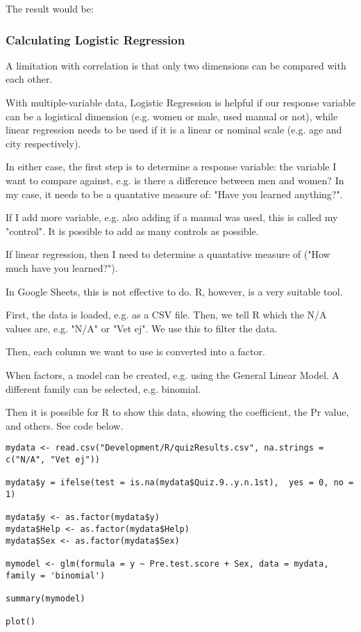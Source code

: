 The result would be:


\subsubsection{Calculating Logistic Regression}

A limitation with correlation is that only two dimensions can be compared with each other.

With multiple-variable data, Logistic Regression is helpful if our response variable can be a logistical dimension (e.g. women or male, used manual or not), while linear regression needs to be used if it is a linear or nominal scale (e.g. age and city respectively).

In either case, the first step is to determine a response variable: the variable I want to compare against, e.g. is there a difference between men and women? In my case, it needs to be a quantative measure of: "Have you learned anything?".

If I add more variable, e.g. also adding if a manual was used, this is called my "control". It is possible to add as many controls as possible.

If linear regression, then I need to determine a quantative measure of ("How much have you learned?").

In Google Sheets, this is not effective to do. R, however, is a very suitable tool.

First, the data is loaded, e.g. as a CSV file. Then, we tell R which the N/A values are, e.g. "N/A" or "Vet ej". We use this to filter the data.

Then, each column we want to use is converted into a factor.

When factors, a model can be created, e.g. using the General Linear Model. A different family can be selected, e.g. binomial.

Then it is possible for R to show this data, showing the coefficient, the Pr value, and others. See code below.

\begin{verbatim}
mydata <- read.csv("Development/R/quizResults.csv", na.strings = c("N/A", "Vet ej"))

mydata$y = ifelse(test = is.na(mydata$Quiz.9..y.n.1st),  yes = 0, no = 1)

mydata$y <- as.factor(mydata$y)
mydata$Help <- as.factor(mydata$Help)
mydata$Sex <- as.factor(mydata$Sex)

mymodel <- glm(formula = y ~ Pre.test.score + Sex, data = mydata, family = 'binomial')

summary(mymodel)

plot()
\end{verbatim}

